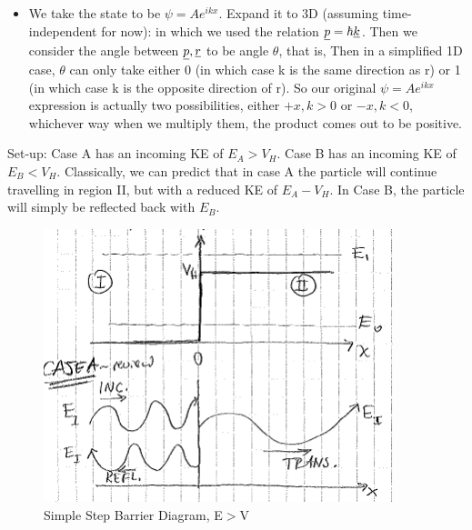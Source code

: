 \documentclass{school-22.101-notes}
\begin{document}
\begin{itemize}
\item We take the state to be $\psi = A e^{ikx}$. Expand it to 3D (assuming time-independent for now):
in which we used the relation $\underline{p} = \hbar \underline{k}$. Then we consider the angle between $\underline{p}, \underline{r}$ to be angle $\theta$, that is, 
Then in a simplified 1D case, $\theta$ can only take either 0 (in which case k is the same direction as r) or 1 (in which case k is the opposite direction of r). So our original $\psi = A e^{ikx}$ expression is actually two possibilities, either $+x, k>0$ or $-x, k<0$, whichever way when we multiply them, the product comes out to be positive. 
\end{itemize}




 \label{simple-step-barrier}
Set-up: Case A has an incoming KE of $E_A > V_H$. Case B has an incoming KE of $E_B < V_H$. Classically, we can predict that in case A the particle will continue travelling in region II, but with a reduced KE of $E_A - V_H$. In Case B, the particle will simply be reflected back with $E_B$. 

\begin{figure}[h!]
    \centering
    \includegraphics[width=4in]{images/qm/step-barrier-caseA.png}
    \caption{Simple Step Barrier Diagram, E$>$V}
\end{figure}
\end{document}
